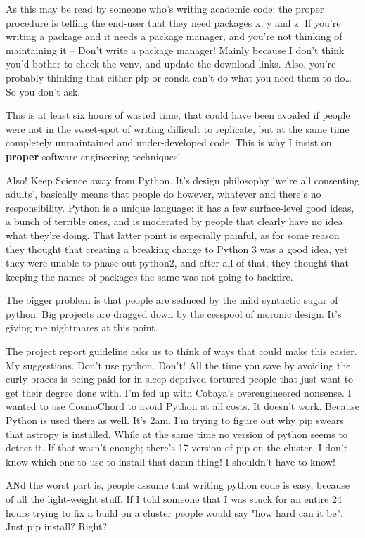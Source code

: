 \documentclass[11pt]{article}
\begin{document}
As this may be read by someone who's writing academic code; the
proper procedure is telling the end-user that they need packages
x, y and z. If you're writing a package and it needs a package
manager, and you're not thinking of maintaining it -- Don't write
a package manager! Mainly because I don't think you'd bother to
check the venv, and update the download links. Also, you're
probably thinking that either pip or conda can't do what you need
them to do\ldots{} So you don't ask. 

This is at least six hours of wasted time, that could have been
avoided if people were not in the sweet-spot of writing difficult
to replicate, but at the same time completely unmaintained and
under-developed code. This is why I insist on \textbf{\textbf{proper}} software
engineering techniques! 

Also! Keep Science away from Python. It's design philosophy 'we're
all consenting adults', basically means that people do however,
whatever and there's no responsibility. Python is a unique
language: it has a few surface-level good ideas, a bunch of
terrible ones, and is moderated by people that clearly have no
idea what they're doing. That latter point is especially painful,
as for some reason they thought that creating a breaking change to
Python 3 was a good idea, yet they were unable to phase out
python2, and after all of that, they thought that keeping the
names of packages the same was not going to backfire.

The bigger problem is that people are seduced by the mild
syntactic sugar of python. Big projects are dragged down by the
cesspool of moronic design. It's giving me nightmares at this
point.

The project report guideline asks us to think of ways that could
make this easier. My suggestions. Don't use python. Don't! All the
time you save by avoiding the curly braces is being paid for in
sleep-deprived tortured people that just want to get their degree
done with. I'm fed up with Cobaya's overengineered nonsense. I
wanted to use CosmoChord to avoid Python at all costs. It doesn't
work. Because Python is used there as well. It's 2am. I'm trying
to figure out why pip swears that astropy is installed. While at
the same time no version of python seems to detect it. If that
wasn't enough; there's 17 version of pip on the cluster. I don't
know which one to use to install that damn thing! I shouldn't have
to know!

ANd the worst part is, people assume that writing python code is
easy, because of all the light-weight stuff. If I told someone
that I was stuck for an entire 24 hours trying to fix a build on a
cluster people would say "how hard can it be". Just pip install?
Right? 
\end{document}
